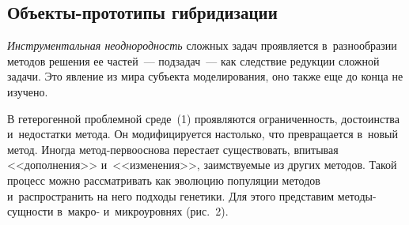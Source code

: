 \begin{multicols}{2}
  \vspace*{-6pt}
  
\section{Объекты-прототипы гибридизации}

  \textit{Инструментальная неоднородность} сложных задач проявляется в~разнообразии 
методов решения ее частей~--- подзадач~--- как следствие редукции сложной задачи. Это 
явление из мира субъекта моделирования, оно также еще до конца не изучено.

  В гетерогенной проблемной среде~(1) проявляются ограниченность, достоинства 
и~недостатки метода. Он модифицируется настолько, что превращается в~новый метод. 
Иногда ме\-тод-пер\-во\-осно\-ва перестает существовать, впитывая <<дополнения>> 
и~<<изменения>>, заимствуемые из других методов. Такой процесс можно рассматривать как 
эволюцию популяции методов и~распространить на него подходы генетики. Для этого 
представим методы-сущ\-ности в~макро- и~микроуровнях (рис.~2).

\begin{figure*} %
\vspace*{1pt}
 \begin{center}
 \mbox{%
 \epsfxsize=115.978mm
 }
 \end{center}
 \vspace*{-9pt}
\end{figure*}


\end{multicols}
